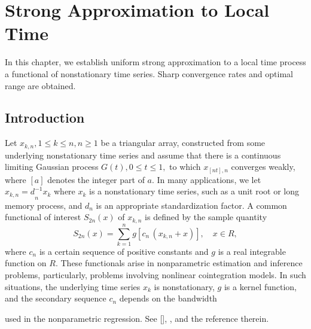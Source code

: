 \chapter{Strong Approximation to Local Time}
\ifpdf
    \graphicspath{{Chapter3/Chapter3Figs/PNG/}{Chapter3/Chapter3Figs/PDF/}{Chapter3/Chapter3Figs/}}
\else
    \graphicspath{{Chapter3/Chapter3Figs/EPS/}{Chapter3/Chapter3Figs/}}
\fi

In this chapter, we establish uniform strong approximation to a local time process a functional of nonstationary time series. Sharp convergence rates and optimal range are obtained. 

\section{Introduction}
Let ${x_{k,n},1\leq k\leq n,n\geq 1}$
 be  a triangular  array, constructed from some
underlying nonstationary time series and assume that there is a continuous
limiting Gaussian process $G(t),0\leq t\leq 1,$ to which $x_{[nt],n}$
converges weakly, where $[a]$ denotes the integer part of $a.$ In many applications, we let ${x_{k,n}=d}_{n}^{-1}{x}%
_{k}$ where $x_{k}$ is a nonstationary time series, such as a unit root or
long memory process, and $d_{n}$ is an appropriate standardization
factor. A common functional of interest $S_{2n}(x)$ of $x_{k,n}$ is defined by
the sample quantity%
\begin{equation}
S_{2n} (x)=\sum_{k=1}^{n}g[c_{n}\,(x_{k,n}+x)], \quad x\in R,
\end{equation}
where $c_{n}$ is a certain sequence of positive constants and $g$ is a real
integrable function on $R$. These functionals arise in nonparametric
estimation and inference  problems, particularly, problems involving nonlinear cointegration
models. In such situations, the underlying time series $x_{k}$ is nonstationary, $g$ is a
kernel function, and the secondary sequence $c_{n}$ depends on the bandwidth

used in the nonparametric regression. See [\citet[][\citeyear{parkphillips2001}]{parkphillips1999}],
\cite{karlsenmyklebusttjostheim2007}, \citet[][\citeyear{wangphillips2010a}, \citeyear{wangphillips2010b}, \citeyear{wangphillips2012}]{wangphillips2009} and the reference therein.

